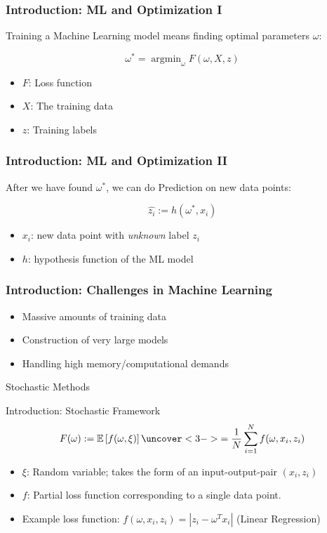 \documentclass[10pt]{beamer}
\DeclareMathOperator{\argmin}{argmin}
\begin{document}
  \begin{frame}\frametitle{Introduction: ML and Optimization I}
    \alert{Training} a Machine Learning model means finding optimal parameters $\omega$:

    $$ \omega^* = \argmin_{\omega} F(\omega, X, z)$$
    
    \begin{itemize}
      \item \alert{$F$}: Loss function
      \item \alert{$X$}: The training data
      \item \alert{$z$}: Training labels
    \end{itemize}   
  \end{frame}

  \begin{frame}\frametitle{Introduction: ML and Optimization II}
    After we have found $\omega^*$, we can do \alert{Prediction} on new data points:

    $$ \hat {z_i} := h(\omega^*, x_i)$$
    
    \begin{itemize}
      \item \alert{$x_i$}: new data point with \emph{unknown} label \alert{$z_i$}
      \item \alert{$h$}: hypothesis function of the ML model
    \end{itemize}   
  \end{frame}

  \begin{frame}
    \frametitle{Introduction: Challenges in Machine Learning}
      \begin{itemize}
        \item Massive amounts of training data 
        \item Construction of very large models
        \item Handling high memory/computational demands
      \end{itemize}
      \vspace{35pt}
    \centering \huge{\alert{Stochastic Methods}}
  \end{frame}
  
  \begin{frame}{Introduction: Stochastic Framework}
    $$ F(\omega) := \mathbb{E}\left[f(\omega, \xi)\right] \uncover<3->{= \frac{1}{N}\sum_{i=1}^N f(\omega, x_i, z_i)}$$
    \begin{itemize}
      \item<2-> \alert{$\xi$}: Random variable; takes the form of an input-output-pair $(x_i, z_i)$
      \item<3-> \alert{$f$}: Partial loss function corresponding to a single data point.
      \item<4-> Example loss function: $f(\omega, x_i, z_i) = |z_i - \omega^Tx_i|$ (Linear Regression)
    \end{itemize}
  \end{frame}
\end{document}
